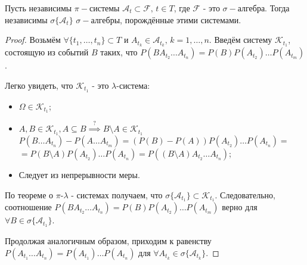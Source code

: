 \begin{theorem}\label{lect04:th3}
	Пусть независимы $\pi-$системы $\mathcal{A}_t \subset \mathcal{F}, \, t \in T$, где $\mathcal{F}$ - это $\sigma-$алгебра. Тогда независимы  $\sigma \{\mathcal{A}_t\}$ $\sigma-$алгебры, порождённые этими системами.
\end{theorem}    
\begin{proof}
	Возьмём $\forall \{t_1, \dots, t_n \} \subset T$ и $A_{t_k} \in \mathcal{A}_{t_k}, \, k = 1, \dots, n$. Введём систему  $\mathcal{K}_{t_1}$, состоящую из событий $B$ таких, что $P(B A_{t_2}\dots A_{t_n}) = P(B)P(A_{t_2})\dots P(A_{t_m})$. 
	
	Легко увидеть, что $\mathcal{K}_{t_1}$ - это $\lambda$-система: 
	\begin{itemize}
		\item $\Omega \in \mathcal{K}_{t_1}$;
		\item $A, B \in \mathcal{K}_{t_1}, A\subseteq B \overset{?}{\implies} B \setminus A \in        \mathcal{K}_{t_1}$\\
		$P(B\dots A_{t_n}) - P(A\dots A_{t_m}) = (P(B) - P(A))P(A_{t_2})\dots P(A_{t_n}) = $\\
		$ = P(B\setminus A)P(A_{t_2})\dots P(A_{t_n}) = P((B\setminus A)A_{t_2} \dots A_{t_n})$;
		\item Следует из непрерывности меры.
	\end{itemize}
	
	По теореме о $\pi$-$\lambda$ - системах получаем, что $\sigma \{\mathcal{A}_{t_1} \} \subset \mathcal{K}_{t_1}$. Следовательно, соотношение $P(B A_{t_2}\dots A_{t_n}) = P(B)P(A_{t_2})\dots P(A_{t_m})$ верно для $\forall B \in \sigma\{\mathcal{A}_{t_1} \}$.
	
	
	Продолжая аналогичным образом, приходим к равенству $P(A_{t_1}\dots A_{t_n}) = P(A_{t_1})\dots P(A_{t_n})$ для $\forall A_{t_k} \in \sigma \{\mathcal{A}_{t_k} \}$.
\end{proof}


